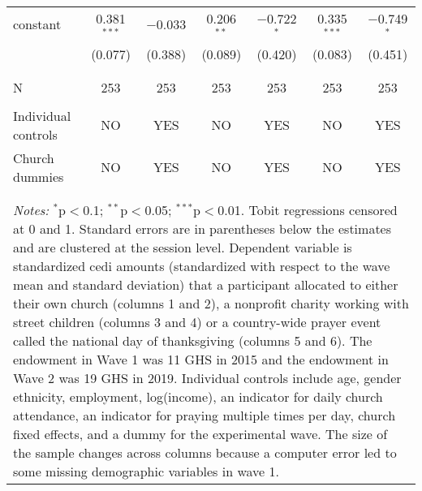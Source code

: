 \begin{table}[!htbp]
\begin{tabular}{@{\extracolsep{5pt}}lcccccc}
 constant & 0.381$^{***}$ & $-$0.033 & 0.206$^{**}$ & $-$0.722$^{*}$ & 0.335$^{***}$ & $-$0.749$^{*}$ \\ 
  & (0.077) & (0.388) & (0.089) & (0.420) & (0.083) & (0.451) \\ 
  & & & & & & \\ 
\cline{2-7} \\[-2.0ex]
N & 253 & 253 & 253 & 253 & 253 & 253 \\  \hline \\[-1.8ex] 
Individual controls & NO & YES & NO & YES & NO & YES \\ 
Church dummies & NO & YES & NO & YES & NO & YES \\ 
\\[-2.0ex]
\hline 
\hline \\[-1.8ex] 
\multicolumn{7}{l}{ \parbox[t]{0.95\linewidth}{\small{ \textit{Notes:} $^{*}$p$<$0.1; $^{**}$p$<$0.05; $^{***}$p$<$0.01}.  Tobit regressions censored at 0 and 1. Standard errors are in parentheses below the estimates and are clustered at the session level. Dependent variable is standardized cedi amounts (standardized with respect to the wave mean and standard deviation) that a participant allocated to either their own church (columns 1 and 2), a nonprofit charity working with street children (columns 3 and 4) or a country-wide prayer event called the national day of thanksgiving (columns 5 and 6). The endowment in Wave 1 was 11 GHS in 2015 and the endowment in Wave 2 was 19 GHS in 2019. Individual controls include age, gender ethnicity, employment, log(income), an indicator for daily church attendance, an indicator for praying multiple times per day, church fixed effects, and a dummy for the experimental wave. The size of the sample changes across columns because a computer error led to some missing demographic variables in wave 1. }}\\
\end{tabular} 
\end{table} 

